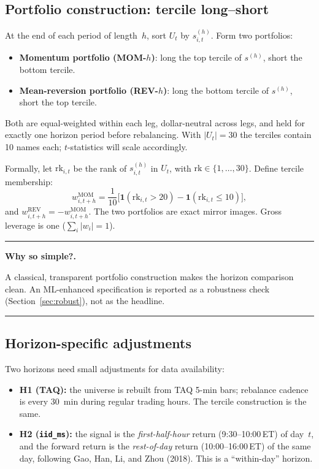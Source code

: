 \documentclass[11pt,letterpaper]{article}
\newenvironment{keybox}[1][Key Point]
  {\begin{center}\begin{minipage}{0.95\linewidth}\vspace{2pt}
   \rule{\linewidth}{0.5pt}\par\textbf{#1.}\par\vspace{-2pt}}
  {\par\rule{\linewidth}{0.5pt}\end{minipage}\end{center}}
\begin{document}
\subsection{Portfolio construction: tercile long--short}

At the end of each period of length~$h$, sort $U_t$ by $s^{(h)}_{i,t}$. Form two portfolios:

\begin{itemize}[leftmargin=*]
  \item \textbf{Momentum portfolio (MOM-$h$)}: long the top tercile of $s^{(h)}$, short the bottom tercile.
  \item \textbf{Mean-reversion portfolio (REV-$h$)}: long the bottom tercile of $s^{(h)}$, short the top tercile.
\end{itemize}

Both are equal-weighted within each leg, dollar-neutral across legs, and held for exactly one horizon period before rebalancing. With $|U_t|=30$ the terciles contain 10 names each; $t$-statistics will scale accordingly.

Formally, let $\mathrm{rk}_{i,t}$ be the rank of $s^{(h)}_{i,t}$ in $U_t$, with $\mathrm{rk}\in\{1,\dots,30\}$. Define tercile membership:
\begin{equation}
w^{\text{MOM}}_{i,t+h} = \frac{1}{10}\bigl[\mathbf{1}(\mathrm{rk}_{i,t}>20) - \mathbf{1}(\mathrm{rk}_{i,t}\le 10)\bigr],
\end{equation}
and $w^{\text{REV}}_{i,t+h} = -w^{\text{MOM}}_{i,t+h}$. The two portfolios are exact mirror images. Gross leverage is one ($\sum_i |w_i| = 1$).

\begin{keybox}[Why so simple?]
A classical, transparent portfolio construction makes the horizon comparison clean. An ML-enhanced specification is reported as a robustness check (Section~\ref{sec:robust}), not as the headline.
\end{keybox}

\subsection{Horizon-specific adjustments}

Two horizons need small adjustments for data availability:

\begin{itemize}[leftmargin=*]
  \item \textbf{H1 (TAQ):} the universe is rebuilt from TAQ 5-min bars; rebalance cadence is every 30~min during regular trading hours. The tercile construction is the same.
  \item \textbf{H2 (\texttt{iid\_ms}):} the signal is the \emph{first-half-hour} return (9:30--10:00\,ET) of day~$t$, and the forward return is the \emph{rest-of-day} return (10:00--16:00\,ET) of the same day, following Gao, Han, Li, and Zhou (2018). This is a ``within-day'' horizon.
\end{itemize}
\end{document}
